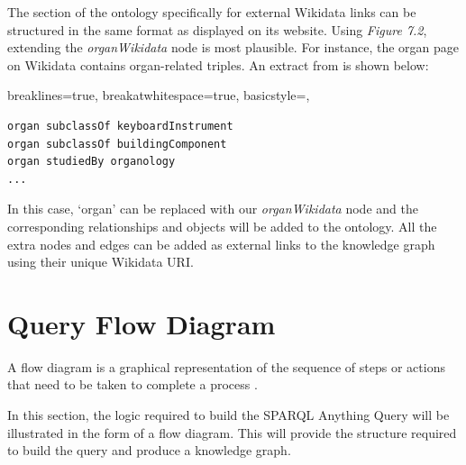 The section of the ontology specifically for external Wikidata links can be structured in the same format as displayed on its website. Using \textit{Figure 7.2}, extending the \textit{organWikidata} node is most plausible. For instance, the organ page on Wikidata \cite{organwikidata} contains organ-related triples. An extract from \cite{organwikidata} is shown below:

\lstset
{
    breaklines=true,
    breakatwhitespace=true,
    basicstyle=\linespread{1.5}\ttfamily,
}
\begin{lstlisting}
organ subclassOf keyboardInstrument
organ subclassOf buildingComponent
organ studiedBy organology 
...
\end{lstlisting}

In this case, `organ' can be replaced with our \textit{organWikidata} node and the corresponding relationships and objects will be added to the ontology. All the extra nodes and edges can be added as external links to the knowledge graph using their unique Wikidata URI. 

\section{Query Flow Diagram}
\hspace{0.5cm} A flow diagram is a graphical representation of the sequence of steps or actions that need to be taken to complete a process \cite{flowchart}.

In this section, the logic required to build the SPARQL Anything Query will be illustrated in the form of a flow diagram. This will provide the structure required to build the query and produce a knowledge graph.

